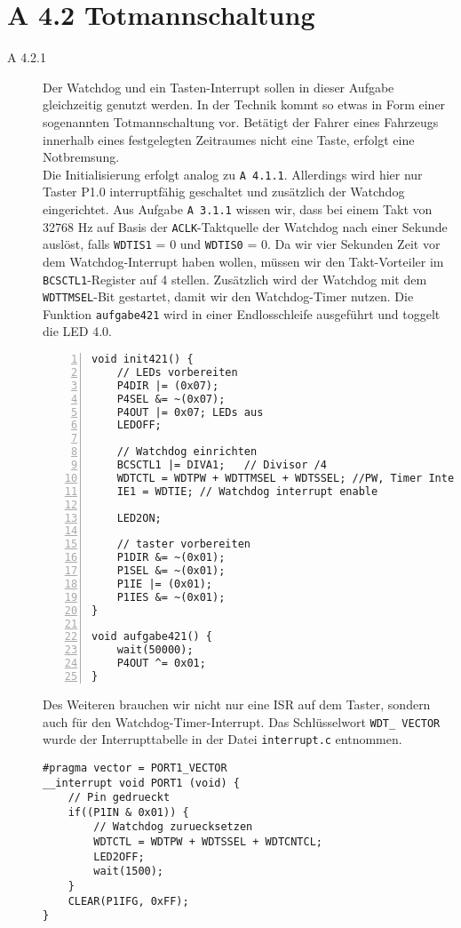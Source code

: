 \documentclass[11pt,a4paper,ngerman]{article}
\begin{document}
\section*{A 4.2 Totmannschaltung}
\begin{description}
	\item[A 4.2.1] Der Watchdog und ein Tasten-Interrupt sollen in dieser Aufgabe gleichzeitig genutzt werden. In der Technik kommt so etwas in Form einer sogenannten Totmannschaltung vor. Betätigt der Fahrer eines Fahrzeugs innerhalb eines festgelegten Zeitraumes nicht eine Taste, erfolgt eine Notbremsung. \\

Die Initialisierung erfolgt analog zu \texttt{A 4.1.1}. Allerdings wird hier nur Taster P1.0 interruptfähig geschaltet und zusätzlich der Watchdog eingerichtet. Aus Aufgabe \texttt{A 3.1.1} wissen wir, dass bei einem Takt von 32768 Hz auf Basis der \texttt{ACLK}-Taktquelle der Watchdog nach einer Sekunde auslöst, falls \texttt{WDTIS1} = 0 und \texttt{WDTIS0} = 0. Da wir vier Sekunden Zeit vor dem Watchdog-Interrupt haben wollen, müssen wir den Takt-Vorteiler im \texttt{BCSCTL1}-Register auf 4 stellen. Zusätzlich wird der Watchdog mit dem \texttt{WDTTMSEL}-Bit gestartet, damit wir den Watchdog-Timer nutzen. Die Funktion \texttt{aufgabe421} wird in einer Endlosschleife ausgeführt und toggelt die LED 4.0.

\begin{lstlisting}[numbers=left]
void init421() {
	// LEDs vorbereiten
	P4DIR |= (0x07);
	P4SEL &= ~(0x07);
	P4OUT |= 0x07; LEDs aus
	LEDOFF;
	
	// Watchdog einrichten
	BCSCTL1 |= DIVA1;	// Divisor /4
	WDTCTL = WDTPW + WDTTMSEL + WDTSSEL; //PW, Timer Interval, ACLK
	IE1 = WDTIE; // Watchdog interrupt enable
	
	LED2ON;
	
	// taster vorbereiten
	P1DIR &= ~(0x01);
	P1SEL &= ~(0x01);
	P1IE |= (0x01);
	P1IES &= ~(0x01);
}

void aufgabe421() {
	wait(50000);
	P4OUT ^= 0x01;
}
\end{lstlisting}
	
Des Weiteren brauchen wir nicht nur eine ISR auf dem Taster, sondern auch für den Watchdog-Timer-Interrupt. Das Schlüsselwort \texttt{WDT\_ VECTOR} wurde der Interrupttabelle in der Datei \texttt{interrupt.c} entnommen.
\newpage
\begin{lstlisting}
#pragma vector = PORT1_VECTOR
__interrupt void PORT1 (void) {
	// Pin gedrueckt
	if((P1IN & 0x01)) {
		// Watchdog zuruecksetzen
		WDTCTL = WDTPW + WDTSSEL + WDTCNTCL;
		LED2OFF;
		wait(1500);
	}
	CLEAR(P1IFG, 0xFF);
}



\end{lstlisting}
\end{description}
\end{document}
